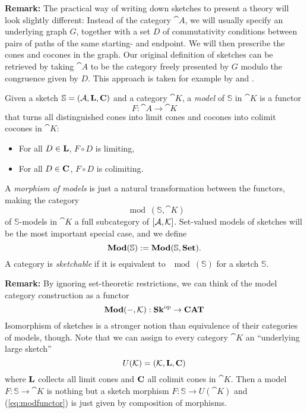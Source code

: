 \textbf{Remark:} The practical way of writing down sketches to present a theory will look slightly different: Instead of the category $\cat A$, we will usually specify an underlying graph $G$, together with a set $D$ of commutativity conditions between pairs of paths of the same starting- and endpoint. We will then prescribe the cones and cocones in the graph. Our original definition of sketches can be retrieved by taking $\cat A$ to be the category freely presented by $G$ modulo the congruence given by $D$. This approach is taken for example by \cite{MakkaiPare} and \cite{elephant}.

\begin{Definition}
Given a sketch $\mathbb S = (\mathcal{A}, \textbf{L}, \textbf{C})$ and a category $\cat K$, a \emph{model} of $\mathbb S$ in $\cat K$ is a functor
\[ F : \cat A \to \cat K \]
that turns all distinguished cones into limit cones and cocones into colimit cocones in $\cat K$:\begin{itemize}
\item For all $D \in \textbf{L}$, $F \circ D$ is limiting,
\item For all $D \in \textbf{C}$, $F \circ D$ is colimiting.
\end{itemize}

A \emph{morphism of models} is just a natural transformation between the functors, making the category \[ \mod(\mathbb S, \cat K) \]
of $\mathbb S$-models in $\cat K$ a full subcategory of $[\mathcal{A},\mathcal{K}]$. Set-valued models of sketches will be the most important special case, and we define
\[ \mathbf{Mod}(\mathbb S) := \mathbf{Mod}(\mathbb S, \mathbf{Set}). \]
A category is \emph{sketchable} if it is equivalent to $\mod(\mathbb S)$ for a sketch $\mathbb S$.
\end{Definition}

\textbf{Remark:} By ignoring set-theoretic restrictions, we can think of the model category construction as a functor
\begin{equation}
\label{eq:modfunctor} \mathbf{Mod}(-, \mathcal{K}) : \mathbf{Sk}^{\textrm{op}} \to \mathbf{CAT}
\end{equation}
Isomorphism of sketches is a stronger notion than equivalence of their categories of models, though. Note that we can assign to every category $\cat K$ an ``underlying large sketch'' 
\[ U(\mathcal{K}) = (\mathcal{K}, \textbf{L}, \textbf{C}) \]
where $\textbf{L}$ collects all limit cones and $\textbf{C}$ all colimit cones in $\cat K$. Then a model $F : \mathbb S \to \cat K$ is nothing but a sketch morphism $F : \mathbb S \to U(\cat K)$ and (\ref{eq:modfunctor}) is just given by composition of morphisms. \\

